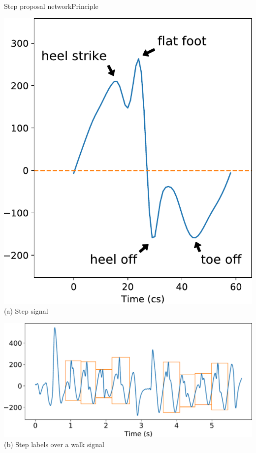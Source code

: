 \documentclass[8pt,t,aspectratio=1610]{beamer}
\begin{document}
\begin{frame}[noframenumbering]{Step proposal network}{Principle}
    \centering
    \begin{minipage}[t]{0.4\linewidth}
        \centering
        \includegraphics[width=0.55\linewidth]{example_step.pdf}\\
        {\small (a)\; Step signal}
    \end{minipage}\hfill
    \begin{minipage}[t]{0.5\linewidth}
        \centering
        \includegraphics[width=0.9\linewidth]{signal_walk_young_female_stepboxes.pdf}\\
        {\small (b)\; Step labels over a walk signal}
    \end{minipage}
\end{frame}
\end{document}
